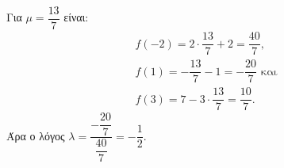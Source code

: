 \begin{alist}
\begin{rlist}
\item Για $\mu = \dfrac{13}{7}$ είναι:
\begin{gather*}
f(-2) = 2 \cdot \dfrac{13}{7} + 2 = \dfrac{40}{7}, \\
f(1) = -\dfrac{13}{7} - 1 = -\dfrac{20}{7}\text{ και} \\
f(3) = 7 - 3 \cdot \dfrac{13}{7} = \dfrac{10}{7}.
\end{gather*}
Άρα ο λόγος $\lambda = \dfrac{-\dfrac{20}{7}}{\dfrac{40}{7}} = -\dfrac{1}{2}$.
\end{rlist}
\end{alist}


